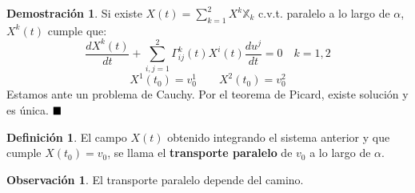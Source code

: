 \documentclass[twoside]{report}
\theoremstyle{definition}
\newtheorem{observacion}[theorem]{Observación}
\newtheorem{defi}[theorem]{Definición}
\newtheorem*{dem}{Demostración}
\newcommand*{\QED}{\hfill\ensuremath{\blacksquare}}
\numberwithin{equation}{section}
\newcommand{\X}{\mathbb{X}}
\begin{document}
\begin{dem}
Si existe $X(t) = \sum_{k=1}^2 X^k \X_k$ c.v.t. paralelo a lo largo de $α$, $X^k(t)$ cumple que:
\[ \frac{dX^k(t)}{dt} + \sum_{i,j=1}^2 Γ_{ij}^k(t) X^i(t) \frac{du^j}{dt} = 0 \quad k=1,2 \]
\[ X^1(t_0) = v_0^1  \qquad X^2(t_0) = v_0^2 \]
Estamos ante un problema de Cauchy. Por el teorema de Picard, existe solución y es única.
$\QED$
\end{dem}

\begin{defi}
El campo $X(t)$ obtenido integrando el sistema anterior y que cumple $X(t_0) = v_0$, se llama el \textbf{transporte paralelo} de $v_0$ a lo largo de $α$.
\end{defi}


\begin{observacion}
El transporte paralelo depende del camino.
\end{observacion}
\end{document}
